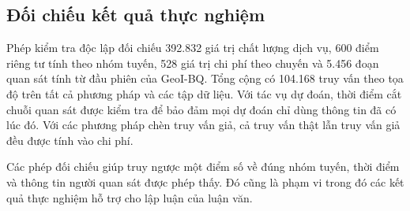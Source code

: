 \subsection{Đối chiếu kết quả thực nghiệm}
Phép kiểm tra độc lập đối chiếu 392.832 giá trị chất lượng dịch vụ, 600 điểm riêng tư tính theo nhóm tuyến, 528 giá trị chi phí theo chuyến và 5.456 đoạn quan sát tính từ đầu phiên của GeoI-BQ. Tổng cộng có 104.168 truy vấn theo tọa độ trên tất cả phương pháp và các tập dữ liệu. Với tác vụ dự đoán, thời điểm cắt chuỗi quan sát được kiểm tra để bảo đảm mọi dự đoán chỉ dùng thông tin đã có lúc đó. Với các phương pháp chèn truy vấn giả, cả truy vấn thật lẫn truy vấn giả đều được tính vào chi phí.

Các phép đối chiếu giúp truy ngược một điểm số về đúng nhóm tuyến, thời điểm và thông tin người quan sát được phép thấy. Đó cũng là phạm vi trong đó các kết quả thực nghiệm hỗ trợ cho lập luận của luận văn.
